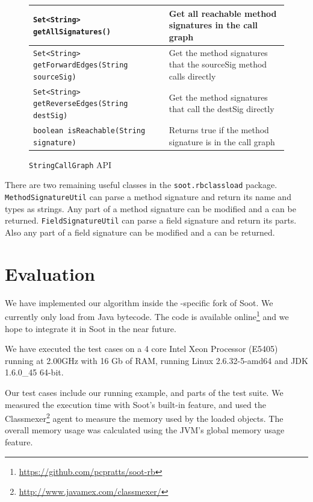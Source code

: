 \documentclass[preprint]{sigplanconf}
\begin{document}
\begin{figure}[htbf]
\begin{tabularx}{\columnwidth}{|XX|}
\hline
{\tt Set<String> getAllSignatures()} & Get all reachable method 
    signatures in the call graph\\\hline 
{\tt Set<String> getForwardEdges(String sourceSig)} & Get the
    method signatures that the sourceSig method calls directly\\\hline  
{\tt Set<String> getReverseEdges(String destSig)} & Get the
    method signatures that call the destSig directly\\\hline
{\tt boolean isReachable(String signature)} & Returns true if the
    method signature is in the call graph\\\hline
\end{tabularx}
\caption{{\tt StringCallGraph} API}
\label{fig:scg}
\end{figure}

There are two remaining useful classes in the {\tt soot.\-rbclassload} package. {\tt MethodSignatureUtil} can parse a method signature and return its name and types as strings. Any part of a method signature can be modified and a \sootmethod can be returned. {\tt FieldSignatureUtil} can parse a field signature and return its parts. Also any part of a field signature can be modified and a \sootfield can be returned.

\section{Evaluation}
\label{sec:eval}

We have implemented our algorithm inside the \rb{}-specific fork of Soot. We currently only load from Java bytecode. The code is available online\footnote{\url{https://github.com/pcpratts/soot-rb}} and we hope to integrate it in Soot in the near future.

We have executed the test cases on a 4 core Intel Xeon Processor (E5405) running at 2.00GHz with 16 Gb of RAM, running Linux 2.6.32-5-amd64 and JDK 1.6.0\_45 64-bit. 

Our test cases include our running example, and parts of the \rb test suite. We measured the execution time with Soot's built-in feature, and used the Classmexer\footnote{\url{http://www.javamex.com/classmexer/}} agent to measure the memory used by the loaded \sootclass objects. The overall memory usage was calculated using the JVM's global memory usage feature.
\end{document}
